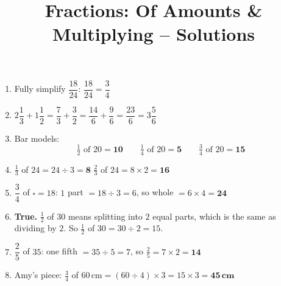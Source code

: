 \documentclass{beamer}
\title{Fractions: Of Amounts \& Multiplying -- Solutions}
\author{}
\date{}
\begin{document}
\frame{\titlepage}

\begin{frame}

\vspace{-1em}
\small
\begin{enumerate}

  \item Fully simplify $\dfrac{18}{24}$:
  \quad $\dfrac{18}{24} = \dfrac{3}{4}$

  \item $2\dfrac{1}{3} + 1\dfrac{1}{2} = \dfrac{7}{3} + \dfrac{3}{2} = \dfrac{14}{6} + \dfrac{9}{6} = \dfrac{23}{6} = 3\dfrac{5}{6}$

  \item Bar models:
  \[
    \tfrac{1}{2}\text{ of }20 = \mathbf{10}
    \qquad
    \tfrac{1}{4}\text{ of }20 = \mathbf{5}
    \qquad
    \tfrac{3}{4}\text{ of }20 = \mathbf{15}
  \]

  \item $\tfrac{1}{3}$ of $24 = 24 \div 3 = \mathbf{8}$
  \hfill
  $\tfrac{2}{3}$ of $24 = 8 \times 2 = \mathbf{16}$

  \item $\dfrac{3}{4}$ of $\square = 18$:
  \quad $1$ part $= 18 \div 3 = 6$, so whole $= 6 \times 4 = \mathbf{24}$

  \item \textbf{True.} $\tfrac{1}{2}$ of $30$ means splitting into $2$ equal parts, which is the same as dividing by $2$. So $\tfrac{1}{2}$ of $30 = 30 \div 2 = 15$. \checkmark

  \item $\dfrac{2}{5}$ of $35$: one fifth $= 35 \div 5 = 7$, so $\tfrac{2}{5} = 7 \times 2 = \mathbf{14}$

  \item Amy's piece: $\tfrac{3}{4}$ of $60\,\text{cm} = (60 \div 4) \times 3 = 15 \times 3 = \mathbf{45\,cm}$

\end{enumerate}
\end{frame}
\end{document}
